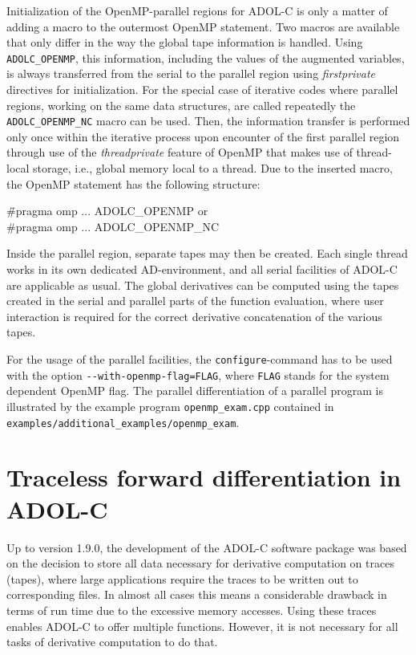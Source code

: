 \documentclass[11pt,twoside]{article}
\begin{document}
Initialization of the OpenMP-parallel regions for \mbox{ADOL-C} is only a matter of adding a macro to the outermost OpenMP statement.
Two macros are available that only differ in the way the global tape information is handled.
Using {\tt ADOLC\_OPENMP}, this information, including the values of the augmented variables, is always transferred from the serial to the parallel region using {\it firstprivate} directives for initialization.
For the special case of iterative codes where parallel regions, working on the same data structures, are called repeatedly the {\tt ADOLC\_OPENMP\_NC} macro can be used.
Then, the information transfer is performed only once within the iterative process upon encounter of the first parallel region through use of the {\it threadprivate} feature of OpenMP that makes use of thread-local storage, i.e., global memory local to a thread.
Due to the inserted macro, the OpenMP statement has the following structure:
\begin{tabbing}
\hspace*{1cm} \= {\sf \#pragma omp ... ADOLC\_OPENMP} \qquad \qquad or \\
              \> {\sf \#pragma omp ... ADOLC\_OPENMP\_NC}
\end{tabbing}
Inside the parallel region, separate tapes may then be created.
Each single thread works in its own dedicated AD-environment, and all
serial facilities of \mbox{ADOL-C} are applicable as usual. The global
derivatives can be computed using the tapes created in the serial and
parallel parts of the function evaluation, where user interaction is
required for the correct derivative concatenation of the various tapes.

For the usage of the parallel facilities, the \verb=configure=-command
has to be used with the option \verb?--with-openmp-flag=FLAG?, where 
\verb=FLAG= stands for the system dependent OpenMP flag.
The parallel differentiation of a parallel program is illustrated
by the example program \verb=openmp_exam.cpp= contained in \verb=examples/additional_examples/openmp_exam=.
%
%
\section{Traceless forward differentiation in ADOL-C}
\label{traceless}
%
Up to version 1.9.0, the development of the ADOL-C software package
was based on the decision to store all data necessary for derivative
computation on traces (tapes), where large applications require the traces to be
written out to corresponding files. In almost all cases this means
a considerable drawback in terms of run time due to the excessive
memory accesses. Using these traces enables ADOL-C to offer multiple
functions. However, it is not necessary for all tasks of derivative
computation to do that. 
\end{document}
